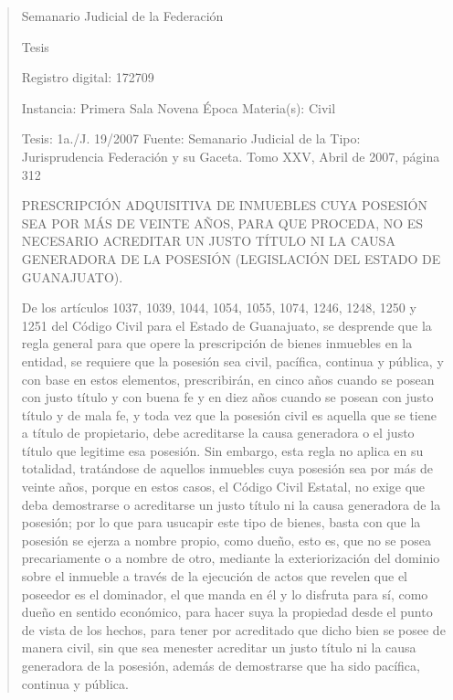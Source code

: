 \documentclass[11pt,a4paper]{article}
\begin{document}
\begin{quote}
                                                   Semanario Judicial de la Federación

                                                  Tesis

 Registro digital: 172709

 Instancia: Primera Sala          Novena Época                          Materia(s): Civil

 Tesis: 1a./J. 19/2007            Fuente: Semanario Judicial de la      Tipo: Jurisprudencia
                                  Federación y su Gaceta.
                                  Tomo XXV, Abril de 2007, página
                                  312


PRESCRIPCIÓN ADQUISITIVA DE INMUEBLES CUYA POSESIÓN SEA POR MÁS DE VEINTE
AÑOS, PARA QUE PROCEDA, NO ES NECESARIO ACREDITAR UN JUSTO TÍTULO NI LA
CAUSA GENERADORA DE LA POSESIÓN (LEGISLACIÓN DEL ESTADO DE GUANAJUATO).


De los artículos 1037, 1039, 1044, 1054, 1055, 1074, 1246, 1248, 1250 y 1251 del Código Civil para
el Estado de Guanajuato, se desprende que la regla general para que opere la prescripción de
bienes inmuebles en la entidad, se requiere que la posesión sea civil, pacífica, continua y pública, y
con base en estos elementos, prescribirán, en cinco años cuando se posean con justo título y con
buena fe y en diez años cuando se posean con justo título y de mala fe, y toda vez que la posesión
civil es aquella que se tiene a título de propietario, debe acreditarse la causa generadora o el justo
título que legitime esa posesión. Sin embargo, esta regla no aplica en su totalidad, tratándose de
aquellos inmuebles cuya posesión sea por más de veinte años, porque en estos casos, el Código
Civil Estatal, no exige que deba demostrarse o acreditarse un justo título ni la causa generadora de
la posesión; por lo que para usucapir este tipo de bienes, basta con que la posesión se ejerza a
nombre propio, como dueño, esto es, que no se posea precariamente o a nombre de otro, mediante
la exteriorización del dominio sobre el inmueble a través de la ejecución de actos que revelen que el
poseedor es el dominador, el que manda en él y lo disfruta para sí, como dueño en sentido
económico, para hacer suya la propiedad desde el punto de vista de los hechos, para tener por
acreditado que dicho bien se posee de manera civil, sin que sea menester acreditar un justo título ni
la causa generadora de la posesión, además de demostrarse que ha sido pacífica, continua y
pública.



\end{quote}
\end{document}
